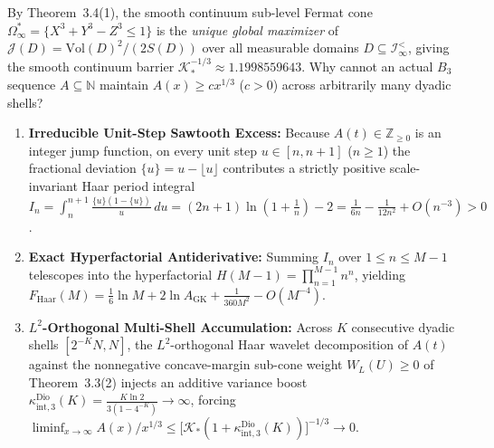 \documentclass[11pt,a4paper]{article}
\theoremstyle{remark}
\begin{document}
\begin{haarbox}
By Theorem~3.4(1), the smooth continuum sub-level Fermat cone $\Omega_\infty^* = \{X^3 + Y^3 - Z^3 \le 1\}$ is the \emph{unique global maximizer} of $\mathcal{J}(D) = \mathrm{Vol}(D)^2/(2S(D))$ over all measurable domains $D \subseteq \mathcal{I}_\infty^{<}$, giving the smooth continuum barrier $\mathcal{K}_*^{-1/3} \approx 1.1998559643$. Why cannot an actual $B_3$ sequence $A \subseteq \mathbb{N}$ maintain $A(x) \ge c x^{1/3}$ ($c > 0$) across arbitrarily many dyadic shells?
\begin{enumerate}
  \item \textbf{Irreducible Unit-Step Sawtooth Excess:} Because $A(t) \in \mathbb{Z}_{\ge 0}$ is an integer jump function, on every unit step $u \in [n, n+1]$ ($n \ge 1$) the fractional deviation $\{u\} = u - \lfloor u \rfloor$ contributes a strictly positive scale-invariant Haar period integral $I_n = \int_n^{n+1} \frac{\{u\}(1-\{u\})}{u}\,du = (2n+1)\ln(1 + \frac{1}{n}) - 2 = \frac{1}{6n} - \frac{1}{12n^2} + O(n^{-3}) > 0$.
  \item \textbf{Exact Hyperfactorial Antiderivative:} Summing $I_n$ over $1 \le n \le M - 1$ telescopes into the hyperfactorial $H(M-1) = \prod_{n=1}^{M-1} n^n$, yielding $F_{\mathrm{Haar}}(M) = \frac{1}{6}\ln M + 2\ln A_{\mathrm{GK}} + \frac{1}{360 M^2} - O(M^{-4})$.
  \item \textbf{$L^2$-Orthogonal Multi-Shell Accumulation:} Across $K$ consecutive dyadic shells $[2^{-K}N, N]$, the $L^2$-orthogonal Haar wavelet decomposition of $A(t)$ against the nonnegative concave-margin sub-cone weight $W_L(U) \ge 0$ of Theorem~3.3(2) injects an additive variance boost $\kappa_{\mathrm{int}, 3}^{\mathrm{Dio}}(K) = \frac{K\ln 2}{3(1 - 4^{-K})} \to \infty$, forcing $\liminf_{x\to\infty} A(x)/x^{1/3} \le \bigl[\mathcal{K}_*(1 + \kappa_{\mathrm{int}, 3}^{\mathrm{Dio}}(K))\bigr]^{-1/3} \to 0$.
\end{enumerate}
\end{haarbox}
\end{document}
